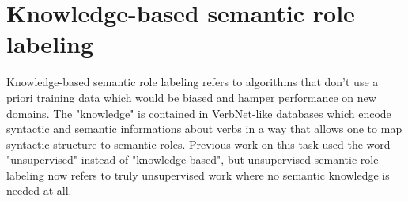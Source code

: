 \section{Knowledge-based semantic role labeling}
\label{sec:srl}

Knowledge-based semantic role labeling refers to algorithms that don't use a
priori training data which would be biased and hamper performance on new
domains. The "knowledge" is contained in VerbNet-like databases which encode
syntactic and semantic informations about verbs in a way that allows one to map
syntactic structure to semantic roles. Previous work on this task used the word
"unsupervised" instead of "knowledge-based", but unsupervised semantic role
labeling now refers to truly unsupervised work where no semantic knowledge is
needed at all.
